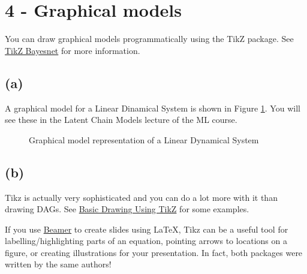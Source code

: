 \section*{4 - Graphical models}

You can draw graphical models programmatically using the TikZ package. See \href{https://github.com/jluttine/tikz-bayesnet}{TikZ Bayesnet} for more information.

\subsection*{(a)}

A graphical model for a Linear Dinamical System is shown in Figure \ref{fig:lds}. You will see these in the Latent Chain Models lecture of the ML course.
\begin{figure}[tbh!]
\begin{center}
\caption{Graphical model representation of a Linear Dynamical System}
\label{fig:lds}
\end{center}
\end{figure}

\subsection*{(b)}
Tikz is actually very sophisticated and you can do a lot more with it than drawing DAGs. See \href{https://www.sharelatex.com/blog/2013/08/27/tikz-series-pt1.html}{Basic Drawing Using TikZ} for some examples.

If you use \href{https://www.sharelatex.com/learn/Beamer}{Beamer} to create slides using LaTeX, Tikz can be a useful tool for labelling/highlighting parts of an equation, pointing arrows to locations on a figure, or creating illustrations for your presentation. In fact, both packages were written by the same authors!

